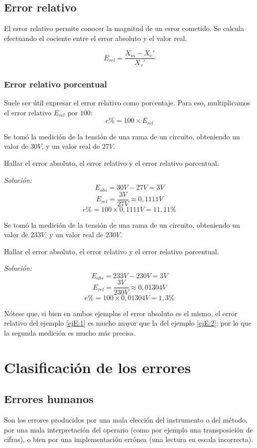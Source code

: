 \subsection{Error relativo}

El error relativo permite conocer la magnitud de un error cometido. Se calcula efectuando el cociente entre el error absoluto y el valor real.

$$ E_{rel} = \frac{X_m-X_v'}{X_v'} $$

\subsubsection{Error relativo porcentual}

Suele ser útil expresar el error relativo como porcentaje. Para eso, multiplicamos el error relativo $E_{rel}$ por $100$: $$ e\% = 100 \times E_{rel} $$

\begin{ejemplo} \label{ejE:1}
	Se tomó la medición de la tensión de una rama de un circuito, obteniendo un valor de $30 V$, y un valor real de $27 V$.
	
	Hallar el error absoluto, el error relativo y el error relativo porcentual.
	
	\emph{Solución:} $$ E_{abs}= 30 V-27 V = 3 V $$ 
	$$ E_{rel} = \frac{3 V}{27 V} \approx 0,1111 V$$
	$$ e\% = 100 \times 0,1111 V = 11,11 \% $$
\end{ejemplo}

\begin{ejemplo}
	\label{ejE:2}
	Se tomó la medición de la tensión de una rama de un circuito, obteniendo un valor de $233 V$, y un valor real de $230 V$.
	
	Hallar el error absoluto, el error relativo y el error relativo porcentual.
	
	\emph{Solución:} $$ E_{abs}= 233 V- 230 V = 3 V $$ 
	$$ E_{rel} = \frac{3 V}{230 V} \approx 0,01304 V$$
	$$ e\% = 100 \times 0,01304 V = 1,3 \% $$
\end{ejemplo}

Nótese que, si bien en ambos ejemplos el error absoluto es el mismo, el error relativo del ejemplo \ref{ejE:1} es mucho mayor que la del ejemplo \ref{ejE:2}; por lo que la segunda medición es mucho más precisa.

\section{Clasificación de los errores}
\subsection{Errores humanos}
Son los errores producidos por una mala elección del instrumento o del método, por una mala interpretación del operario (como por ejemplo una transposición de cifras), o bien por una implementación errónea (una lectura en escala incorrecta).

